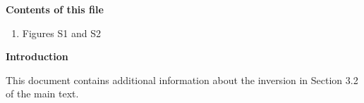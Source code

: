 \documentclass[draft,jgrga]{agutex}
\begin{document}
\begin{article}

%
%

\noindent\textbf{Contents of this file}
\begin{enumerate}
\item Figures S1 and S2
\end{enumerate}
\noindent\textbf{Introduction}

This document contains additional information about the inversion in Section 3.2 of the main text. 


%
%


%
%
%
%
%
%
%
%
%



\end{article}
\end{document}
